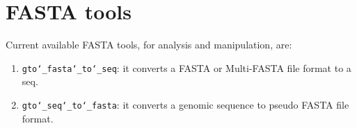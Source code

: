 \chapter{FASTA tools}
\label{fasta}

Current available FASTA tools, for analysis and manipulation, are:
\begin{enumerate}
\item \texttt{gto\char`_fasta\char`_to\char`_seq}: it converts a FASTA or Multi-FASTA file format to a seq.
\item \texttt{gto\char`_seq\char`_to\char`_fasta}: it converts a genomic sequence to pseudo FASTA file format.

\end{enumerate}


